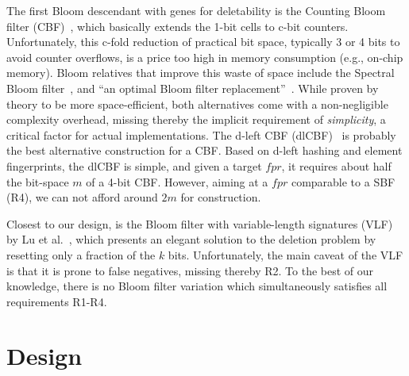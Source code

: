 \documentclass[conference]{IEEEtran}
\begin{document}
The first Bloom descendant with genes for deletability is the Counting Bloom filter (CBF)~\cite{343572}, which basically extends the 1-bit cells to c-bit counters.
Unfortunately, this c-fold reduction of practical bit space, typically 3 or 4 bits to avoid counter overflows, is a price too high in memory consumption (e.g., on-chip memory).  Bloom relatives that improve this waste of space include the Spectral Bloom filter~\cite{872787}, and ``an optimal Bloom filter replacement''~\cite{1070548}. While proven by theory to be more space-efficient, both alternatives come with a non-negligible complexity overhead, missing thereby the implicit requirement of \textit{simplicity}, a critical factor for actual implementations. 
The d-left CBF (dlCBF)~\cite{Bonomi06animproved} is probably the best alternative construction for a CBF. Based on d-left hashing and element fingerprints, the dlCBF is simple, and given a target $fpr$, it requires about half the bit-space $m$ of a 4-bit CBF. However, aiming at a $fpr$ comparable to a SBF (R4), we can not afford 
  around $2m$ for construction. 

Closest to our design, is the Bloom filter with variable-length signatures (VLF) by Lu et al.~\cite{Lu05bloomfilters}, which presents an elegant solution to the deletion problem by resetting only a fraction of the $k$ bits. Unfortunately, the main caveat of the VLF is that it is prone to false negatives, missing thereby R2. 
To the best of our knowledge, there is no Bloom filter variation which simultaneously satisfies all requirements R1-R4. 





\section{Design}
\label{sec:design}
\end{document}
